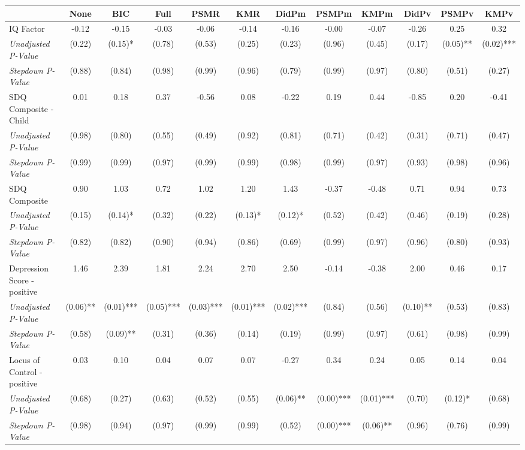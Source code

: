 \begin{tabular}{l c c c c c c c c c c c}
\toprule
 & None & BIC & Full & PSMR & KMR & DidPm & PSMPm & KMPm & DidPv & PSMPv & KMPv \\
\midrule
IQ Factor & -0.12 & -0.15 & -0.03 & -0.06 & -0.14 & -0.16 & -0.00 & -0.07 & -0.26 & 0.25 & 0.32 \\
\quad \textit{Unadjusted P-Value} & (0.22) & (0.15)* & (0.78) & (0.53) & (0.25) & (0.23) & (0.96) & (0.45) & (0.17) & (0.05)** & (0.02)*** \\
\quad \textit{Stepdown P-Value} & (0.88) & (0.84) & (0.98) & (0.99) & (0.96) & (0.79) & (0.99) & (0.97) & (0.80) & (0.51) & (0.27) \\
SDQ Composite - Child & 0.01 & 0.18 & 0.37 & -0.56 & 0.08 & -0.22 & 0.19 & 0.44 & -0.85 & 0.20 & -0.41 \\
\quad \textit{Unadjusted P-Value} & (0.98) & (0.80) & (0.55) & (0.49) & (0.92) & (0.81) & (0.71) & (0.42) & (0.31) & (0.71) & (0.47) \\
\quad \textit{Stepdown P-Value} & (0.99) & (0.99) & (0.97) & (0.99) & (0.99) & (0.98) & (0.99) & (0.97) & (0.93) & (0.98) & (0.96) \\
SDQ Composite & 0.90 & 1.03 & 0.72 & 1.02 & 1.20 & 1.43 & -0.37 & -0.48 & 0.71 & 0.94 & 0.73 \\
\quad \textit{Unadjusted P-Value} & (0.15) & (0.14)* & (0.32) & (0.22) & (0.13)* & (0.12)* & (0.52) & (0.42) & (0.46) & (0.19) & (0.28) \\
\quad \textit{Stepdown P-Value} & (0.82) & (0.82) & (0.90) & (0.94) & (0.86) & (0.69) & (0.99) & (0.97) & (0.96) & (0.80) & (0.93) \\
Depression Score - positive & 1.46 & 2.39 & 1.81 & 2.24 & 2.70 & 2.50 & -0.14 & -0.38 & 2.00 & 0.46 & 0.17 \\
\quad \textit{Unadjusted P-Value} & (0.06)** & (0.01)*** & (0.05)*** & (0.03)*** & (0.01)*** & (0.02)*** & (0.84) & (0.56) & (0.10)** & (0.53) & (0.83) \\
\quad \textit{Stepdown P-Value} & (0.58) & (0.09)** & (0.31) & (0.36) & (0.14) & (0.19) & (0.99) & (0.97) & (0.61) & (0.98) & (0.99) \\
Locus of Control - positive & 0.03 & 0.10 & 0.04 & 0.07 & 0.07 & -0.27 & 0.34 & 0.24 & 0.05 & 0.14 & 0.04 \\
\quad \textit{Unadjusted P-Value} & (0.68) & (0.27) & (0.63) & (0.52) & (0.55) & (0.06)** & (0.00)*** & (0.01)*** & (0.70) & (0.12)* & (0.68) \\
\quad \textit{Stepdown P-Value} & (0.98) & (0.94) & (0.97) & (0.99) & (0.99) & (0.52) & (0.00)*** & (0.06)** & (0.96) & (0.76) & (0.99) \\

\end{tabular}
